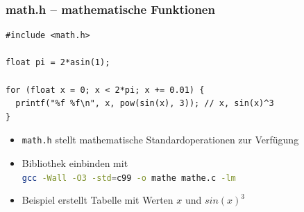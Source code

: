 \documentclass{slides}
\begin{document}
\begin{frame}[fragile]
  \frametitle{math.h -- mathematische Funktionen}

\begin{lstlisting}[emph={asin,sin,piw}]
#include <math.h>

float pi = 2*asin(1);

for (float x = 0; x < 2*pi; x += 0.01) {
  printf("%f %f\n", x, pow(sin(x), 3)); // x, sin(x)^3
}
\end{lstlisting}

  \begin{itemize}
  \item \lstinline!math.h! stellt mathematische Standardoperationen zur Verfügung
  \item Bibliothek einbinden mit\\
    \lstinline[language=bash]!gcc -Wall -O3 -std=c99 -o mathe mathe.c -lm!
  \item Beispiel erstellt Tabelle mit Werten $x$ und $sin(x)^3$
  \end{itemize}
\end{frame}
\end{document}
